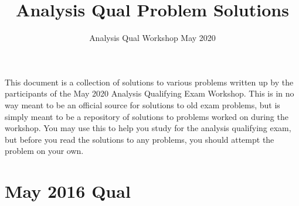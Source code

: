 \documentclass[reqno]{article}
\title{Analysis Qual Problem Solutions}
\author{Analysis Qual Workshop May 2020}
\date
\theoremstyle{remark}
\numberwithin{equation}{section}
\begin{document}
\maketitle

This document is a collection of solutions to various problems written up by the participants of the May 2020 Analysis Qualifying Exam Workshop. This is in no way meant to be an official source for solutions to old exam problems, but is simply meant to be a repository of solutions to problems worked on during the workshop. You may use this to help you study for the analysis qualifying exam, but before you read the solutions to any problems, you should attempt the problem on your own. 


\section{May 2016 Qual}
\end{document}
